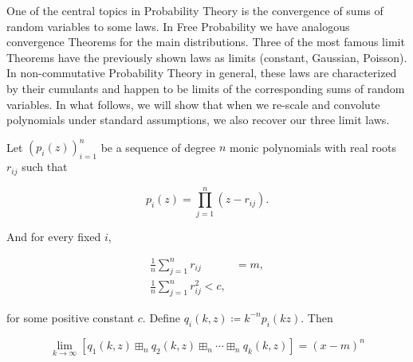 One of the central topics in Probability Theory is the convergence of sums of random variables to some laws. In Free Probability we have analogous convergence Theorems for the main distributions. Three of the most famous limit Theorems have the previously shown laws as limits (constant, Gaussian, Poisson). In non-commutative Probability Theory in general, these laws are characterized by their cumulants and happen to be limits of the corresponding sums of random variables. In what follows, we will show that when we re-scale and convolute polynomials under standard assumptions, we also recover our three limit laws.

\begin{theorem}
    Let $(p_i(z))_{i=1}^n$ be a sequence of degree $n$ monic polynomials with real roots $r_{ij}$ such that

    \begin{equation*}
        p_i(z) = \prod_{j=1}^n (z - r_{ij}).
    \end{equation*}

    And for every fixed $i$,

    \begin{align*}
        \frac1n\sum_{j=1}^n r_{ij} &= m,\\
        \frac1n\sum_{j=1}^n r_{ij}^2 < c,
    \end{align*}

    \noindent for some positive constant $c$. Define $q_i(k,z) \coloneqq k^{-n}p_i(kz)$. Then

    \begin{equation*}
        \lim_{k\to \infty} [ q_1(k,z) \boxplus_n q_2(k,z) \boxplus_n \cdots \boxplus_n q_k(k,z) ] = (x-m)^n
    \end{equation*}
\end{theorem}

